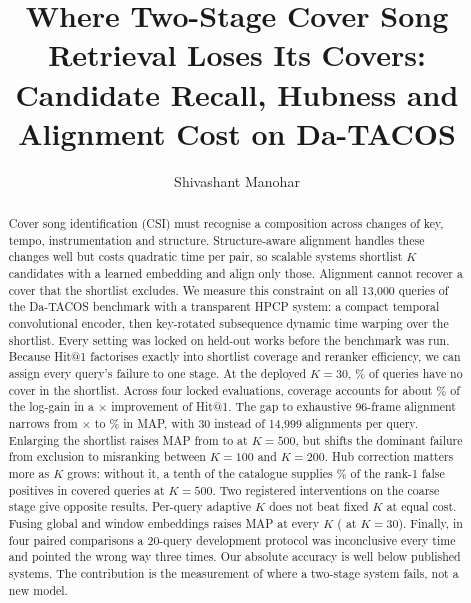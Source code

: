 \documentclass[10pt]{article}
\title{Where Two-Stage Cover Song Retrieval Loses Its Covers:\\
Candidate Recall, Hubness and Alignment Cost on Da-TACOS}
\author{Shivashant Manohar}
\date{}
\begin{document}
\maketitle

\begin{abstract}
Cover song identification (CSI) must recognise a composition across changes of key, tempo, instrumentation and structure.
Structure-aware alignment handles these changes well but costs quadratic time per pair, so scalable systems shortlist $K$ candidates with a learned embedding and align only those.
Alignment cannot recover a cover that the shortlist excludes.
We measure this constraint on all 13{,}000 queries of the Da-TACOS benchmark with a transparent HPCP system: a compact temporal convolutional encoder, then key-rotated subsequence dynamic time warping over the shortlist.
Every setting was locked on held-out works before the benchmark was run.
Because Hit@1 factorises exactly into shortlist coverage and reranker efficiency, we can assign every query's failure to one stage.
At the deployed $K=30$, \MissThirty\% of queries have no cover in the shortlist.
Across four locked evaluations, coverage accounts for about \CoverageShareOfGain\% of the log-gain in a \HitOneGain$\times$ improvement of Hit@1. The gap to exhaustive 96-frame alignment narrows from \ClassicalOverHybOne$\times$ to \GapPctFour\% in MAP, with 30 instead of 14{,}999 alignments per query.
Enlarging the shortlist raises MAP from \SweepMapThirty{} to \SweepMapFiveHundred{} at $K=500$, but shifts the dominant failure from exclusion to misranking between $K=100$ and $K=200$.
Hub correction matters more as $K$ grows: without it, a tenth of the catalogue supplies \POneUncFiveHundredTopDecile\% of the rank-1 false positives in covered queries at $K=500$.
Two registered interventions on the coarse stage give opposite results. Per-query adaptive $K$ does not beat fixed $K$ at equal cost. Fusing global and window embeddings raises MAP at every $K$ (\ATwoApThirty{} at $K=30$).
Finally, in four paired comparisons a 20-query development protocol was inconclusive every time and pointed the wrong way three times.
Our absolute accuracy is well below published systems. The contribution is the measurement of where a two-stage system fails, not a new model.
\end{abstract}

\end{document}
